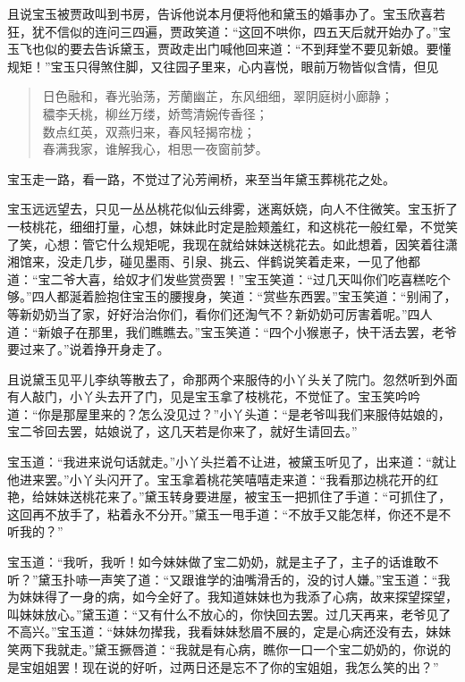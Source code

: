 \documentclass[12pt,oneside]{book}
\newenvironment{shici}{%
\begin{verse}%
\centering\large\hspace{12pt}}%
{\end{verse}}
\begin{document}
且说宝玉被贾政叫到书房，告诉他说本月便将他和黛玉的婚事办了。宝玉欣喜若狂，犹不信似的连问三四遍，贾政笑道：“这回不哄你，四五天后就开始办了。”宝玉飞也似的要去告诉黛玉，贾政走出门喊他回来道：“不到拜堂不要见新娘。要懂规矩！”宝玉只得煞住脚，又往园子里来，心内喜悦，眼前万物皆似含情，但见

\begin{shici}
日色融和，春光骀荡，芳蘭幽芷，东风细细，翠阴庭树小廊静；\\
穠李夭桃，柳丝万缕，娇莺清婉传香径；\\
数点红英，双燕归来，春风轻揭帘栊；\\
春满我家，谁解我心，相思一夜窗前梦。
\end{shici}


宝玉走一路，看一路，不觉过了沁芳闸桥，来至当年黛玉葬桃花之处。

宝玉远远望去，只见一丛丛桃花似仙云绯雾，迷离妖娆，向人不住微笑。宝玉折了一枝桃花，细细打量，心想，妹妹此时定是脸颊羞红，和这桃花一般红晕，不觉笑了笑，心想：管它什么规矩呢，我现在就给妹妹送桃花去。如此想着，因笑着往潇湘馆来，没走几步，碰见墨雨、引泉、挑云、伴鹤说笑着走来，一见了他都道：“宝二爷大喜，给奴才们发些赏赍罢！”宝玉笑道：“过几天叫你们吃喜糕吃个够。”四人都涎着脸抱住宝玉的腰搜身，笑道：“赏些东西罢。”宝玉笑道：“别闹了，等新奶奶当了家，好好治治你们，看你们还淘气不？新奶奶可厉害着呢。”四人道：“新娘子在那里，我们瞧瞧去。”宝玉笑道：“四个小猴崽子，快干活去罢，老爷要过来了。”说着挣开身走了。

且说黛玉见平儿李纨等散去了，命那两个来服侍的小丫头关了院门。忽然听到外面有人敲门，小丫头去开了门，见是宝玉拿了枝桃花，不觉怔了。宝玉笑吟吟道：“你是那屋里来的？怎么没见过？”小丫头道：“是老爷叫我们来服侍姑娘的，宝二爷回去罢，姑娘说了，这几天若是你来了，就好生请回去。”

宝玉道：“我进来说句话就走。”小丫头拦着不让进，被黛玉听见了，出来道：“就让他进来罢。”小丫头闪开了。宝玉拿着桃花笑嘻嘻走来道：“我看那边桃花开的红艳，给妹妹送桃花来了。”黛玉转身要进屋，被宝玉一把抓住了手道：“可抓住了，这回再不放手了，粘着永不分开。”黛玉一甩手道：“不放手又能怎样，你还不是不听我的？”

宝玉道：“我听，我听！如今妹妹做了宝二奶奶，就是主子了，主子的话谁敢不听？”黛玉扑哧一声笑了道：“又跟谁学的油嘴滑舌的，没的讨人嫌。”宝玉道：“我为妹妹得了一身的病，如今全好了。我知道妹妹也为我添了心病，故来探望探望，叫妹妹放心。”黛玉道：“又有什么不放心的，你快回去罢。过几天再来，老爷见了不高兴。”宝玉道：“妹妹勿撵我，我看妹妹愁眉不展的，定是心病还没有去，妹妹笑两下我就走。”黛玉撅唇道：“我就是有心病，瞧你一口一个宝二奶奶的，你说的是宝姐姐罢！现在说的好听，过两日还是忘不了你的宝姐姐，我怎么笑的出？”
\end{document}
